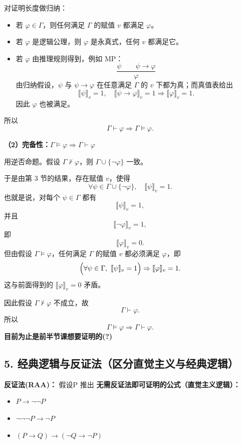 \documentclass[12pt, a4paper]{article}
\begin{document}
对证明长度做归纳：
\begin{itemize}
    \item 若 $\varphi \in \Gamma$，则任何满足 $\Gamma$ 的赋值 $v$ 都满足 $\varphi$。
    \item 若 $\varphi$ 是逻辑公理，则 $\varphi$ 是永真式，任何 $v$ 都满足它。
    \item 若 $\varphi$ 由推理规则得到，例如 MP：
    \[
    \frac{\psi \qquad \psi \to \varphi}{\varphi}
    \]
    由归纳假设，$\psi$ 与 $\psi \to \varphi$ 在任意满足 $\Gamma$ 的 $v$ 下都为真；而真值表给出
    \[
    \llbracket \psi \rrbracket_v = 1,\quad
    \llbracket \psi \to \varphi \rrbracket_v = 1
    \Rightarrow \llbracket \varphi \rrbracket_v = 1.
    \]
    因此 $\varphi$ 也被满足。
\end{itemize}
所以
\[
\Gamma \vdash \varphi \Rightarrow \Gamma \models \varphi.
\]

\vspace{0.3cm}
\textbf{（2）完备性：$\Gamma \models \varphi \Rightarrow \Gamma \vdash \varphi$}

用逆否命题。假设 $\Gamma \nvdash \varphi$，则 $\Gamma \cup \{\neg \varphi\}$ 一致。

于是由第 3 节的结果，存在赋值 $v$，使得
\[
\forall \psi \in \Gamma \cup \{\neg \varphi\},\quad \llbracket \psi \rrbracket_v = 1.
\]
也就是说，对每个 $\psi \in \Gamma$ 都有
\[
\llbracket \psi \rrbracket_v = 1,
\]
并且
\[
\llbracket \neg \varphi \rrbracket_v = 1,
\]
即
\[
\llbracket \varphi \rrbracket_v = 0.
\]
但由假设 $\Gamma \models \varphi$，任何满足 $\Gamma$ 的赋值 $v$ 都必须满足 $\varphi$，即
\[
\Bigl(\forall \psi \in \Gamma,\ \llbracket \psi \rrbracket_v = 1\Bigr)
\Rightarrow
\llbracket \varphi \rrbracket_v = 1.
\]
这与前面得到的 $\llbracket \varphi \rrbracket_v = 0$ 矛盾。

因此假设 $\Gamma \nvdash \varphi$ 不成立，故
\[
\Gamma \vdash \varphi.
\]
所以
\[
\Gamma \models \varphi \Rightarrow \Gamma \vdash \varphi.
\]
\textbf{目前为止是前半节课想要证明的(?)}
\vspace{0.3cm}

\subsection*{5. 经典逻辑与反证法（区分直觉主义与经典逻辑）}

\textbf{反证法(RAA)：} 假设\neg P 推出 \bot
\textbf{无需反证法即可证明的公式（直觉主义逻辑）：}
\begin{itemize}
    \item $P \to \neg\neg P$
    \item $\neg\neg\neg P \to \neg P$
    \item $(P \to Q) \to (\neg Q \to \neg P)$
\end{itemize}
\end{document}
